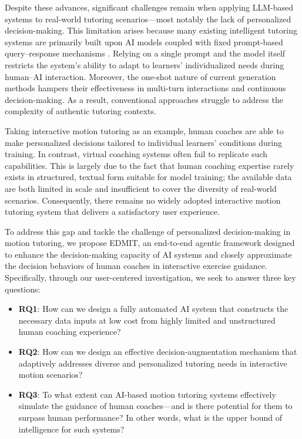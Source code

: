 \documentclass[sigconf]{acmart}
\begin{document}
Despite these advances, significant challenges remain when applying LLM-based systems to real-world tutoring scenarios—most notably the lack of personalized decision-making. This limitation arises because many existing intelligent tutoring systems are primarily built upon AI models coupled with fixed prompt-based query–response mechanisms \cite{goldbachIntelligentTutoringSystems2020,kwonBIPEDPedagogicallyInformed2024}. Relying on a single prompt and the model itself restricts the system’s ability to adapt to learners’ individualized needs during human–AI interaction. Moreover, the one-shot nature of current generation methods hampers their effectiveness in multi-turn interactions and continuous decision-making. As a result, conventional approaches struggle to address the complexity of authentic tutoring contexts.

Taking interactive motion tutoring as an example, human coaches are able to make personalized decisions tailored to individual learners’ conditions during training. In contrast, virtual coaching systems often fail to replicate such capabilities. This is largely due to the fact that human coaching expertise rarely exists in structured, textual form suitable for model training; the available data are both limited in scale and insufficient to cover the diversity of real-world scenarios. Consequently, there remains no widely adopted interactive motion tutoring system that delivers a satisfactory user experience.

To address this gap and tackle the challenge of personalized decision-making in motion tutoring, we propose EDMIT, an end-to-end agentic framework designed to enhance the decision-making capacity of AI systems and closely approximate the decision behaviors of human coaches in interactive exercise guidance. Specifically, through our user-centered investigation, we seek to answer three key questions:

\begin{itemize}
  \item \textbf{RQ1}: How can we design a fully automated AI system that constructs the necessary data inputs at low cost from highly limited and unstructured human coaching experience?
  \item \textbf{RQ2}: How can we design an effective decision-augmentation mechanism that adaptively addresses diverse and personalized tutoring needs in interactive motion scenarios?
  \item \textbf{RQ3}: To what extent can AI-based motion tutoring systems effectively simulate the guidance of human coaches—and is there potential for them to surpass human performance? In other words, what is the upper bound of intelligence for such systems?
  \end{itemize}
  
\end{document}
